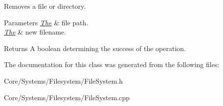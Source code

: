 Removes a file or directory. 


\begin{DoxyParams}{Parameters}
{\em \hyperlink{classThe}{The}} & file path. \\
\hline
{\em \hyperlink{classThe}{The}} & new filename. \\
\hline
\end{DoxyParams}
\begin{DoxyReturn}{Returns}
A boolean determining the success of the operation. 
\end{DoxyReturn}


The documentation for this class was generated from the following files\-:\begin{DoxyCompactItemize}
\item 
Core/\-Systems/\-Filesystem/File\-System.\-h\item 
Core/\-Systems/\-Filesystem/File\-System.\-cpp\end{DoxyCompactItemize}
